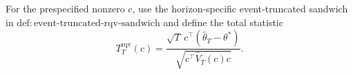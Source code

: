 For the prespecified nonzero \(c\), use the horizon-specific event-truncated sandwich in \(\mathrm{def:event\text{-}truncated\text{-}rqv\text{-}sandwich}\) and define the total statistic
\[
 T_T^{\mathrm{rqv}}(c)=
 \frac{\sqrt T\,c^\top(\widehat\theta_T-\theta^*)}
 {\sqrt{c^\top\widehat V_T(c)c}}.
\]